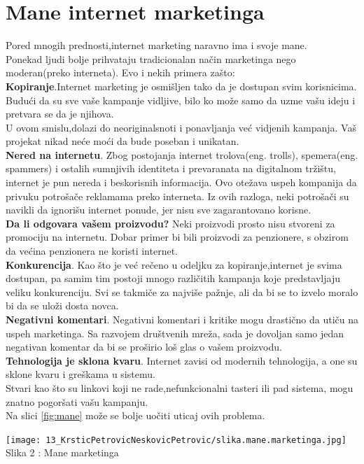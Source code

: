 \documentclass[a4paper]{article}
\begin{document}
{\section{Mane internet marketinga}
\label{sec:mane}
Pored mnogih prednosti,internet marketing naravno ima i svoje mane.
\\Ponekad ljudi bolje prihvataju tradicionalan način marketinga nego moderan(preko interneta). Evo i nekih primera zašto:
\\\textbf{Kopiranje}.Internet marketing je osmišljen tako da je dostupan svim korisnicima. Budući da su sve vaše kampanje vidljive, bilo ko može samo da uzme vašu ideju i pretvara se da je njihova.
\\U ovom smislu,dolazi do neoriginalsnoti i ponavljanja već vidjenih kampanja. Vaš projekat nikad neće moći da bude poseban i unikatan.
\\\textbf{Nered na internetu}.
Zbog postojanja internet trolova(eng. trolls), spemera(eng. spammers) i ostalih sumnjivih identiteta i prevaranata na digitalnom tržištu, internet je pun nereda i beskorisnih informacija. Ovo otežava uspeh kompanija da privuku potrošače reklamama preko interneta. Iz ovih razloga, neki potrošači su navikli da ignorišu internet ponude, jer nisu sve zagarantovano korisne.
\\\textbf{Da li odgovara vašem proizvodu?}
Neki proizvodi prosto nisu stvoreni za promociju na internetu. Dobar primer bi bili proizvodi za penzionere, s obzirom da većina penzionera ne koristi internet.
\\\textbf{Konkurencija}.
Kao što je već rečeno u odeljku za kopiranje,internet je svima dostupan, pa samim tim postoji mnogo različitih kampanja koje predstavljaju veliku konkurenciju. Svi se takmiče za najviše pažnje, ali da bi se to izvelo moralo bi da se uloži dosta novca.
\\\textbf{Negativni komentari}.
Negativni komentari i kritike mogu drastično da utiču na uspeh marketinga. Sa razvojem društvenih mreža, sada je dovoljan samo jedan negativan komentar da bi se proširio loš glas o vašem proizvodu.
\\\textbf{Tehnologija je sklona kvaru}.
 Internet zavisi od modernih tehnologija, a one su sklone kvaru i greškama u sistemu.
\\Stvari kao što su linkovi koji ne rade,nefunkcionalni tasteri ili pad sistema, mogu znatno pogoršati vašu kampanju.
\cite{benefiti i mane}
\\Na slici \ref{fig:mane} može se bolje uočiti uticaj ovih problema.
\begin{center}
    \texttt{[image: 13\_KrsticPetrovicNeskovicPetrovic/slika.mane.marketinga.jpg]}\\
    \large{Slika 2 : Mane marketinga}
\end{center}
\label{fig:mane}
}
\end{document}

